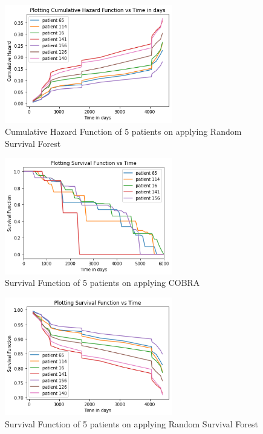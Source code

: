 \documentclass[13pt]{article}
\begin{document}
\begin{figure}[h!]
    \centering
    \includegraphics[width = 0.65\textwidth]{images/hazpy.png}
    \caption{Cumulative Hazard Function of 5 patients on applying Random Survival Forest}
    \label{fig:hazpy}
\end{figure}

\begin{figure}[h!]
    \centering
    \includegraphics[width = 0.65\textwidth]{images/surv.png}
    \caption{Survival Function of 5 patients on applying COBRA }
    \label{fig:surv}
\end{figure}

\begin{figure}[h!]
    \centering
    \includegraphics[width = 0.65\textwidth]{images/survpy.png}
    \caption{Survival Function of 5 patients on applying Random Survival Forest}
    \label{fig:survpy}
\end{figure}
\end{document}
